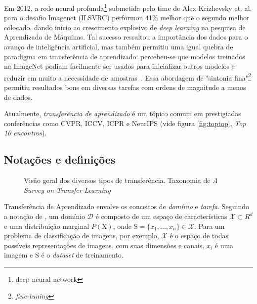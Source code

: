 \documentclass[sigconf]{acmart}
\begin{document}
  Em 2012, a rede neural profunda\footnote{deep neural network} submetida pelo time de Alex Krizhevsky et. al. para o desafio Imagenet (ILSVRC) performou 41\% melhor que o segundo melhor colocado, dando início ao crescimento explosivo de \emph{deep learning} na pesquisa de Aprendizado de Máquinas. Tal sucesso ressaltou a importância dos dados para o avanço de inteligência artificial, mas também permitiu uma igual quebra de paradigma em transferência de aprendizado: percebeu-se que modelos treinados na ImageNet podiam facilmente ser usados para inicializar outros modelos e reduzir em muito a necessidade de amostras~\cite{Ruder2019Neural}.   Essa abordagem de "sintonia fina"\footnote{\emph{fine-tuning}} permitiu resultados bons em diversas tarefas com ordens de magnitude a menos de dados. 

  Atualmente, \emph{transferência de aprendizado} é um tópico comum em prestigiadas conferências como CVPR, ICCV, ICPR e NeurIPS (vide figura \ref{fig:toptop}, \emph{Top 10 encontros}).
  \subsection{Notações e definições}
  \begin{figure}[h]
    \caption{Visão geral dos diversos tipos de transferência. Taxonomia de \emph{A Survey on Transfer Learning} }
    \label{fig:taxonomia}
  \end{figure}
    Transferência de Aprendizado envolve os conceitos de \emph{domínio} e \emph{tarefa}. Seguindo a notação de \cite{PanYang}, um domínio $\mathcal{D}$ é composto de um espaço de características $\mathcal{X}\subset R^d$ e uma distribuição marginal $P(\mathrm{X})$, onde $\mathrm{S}=\{x_1, \dots, x_n\}\in\mathcal{X} $. Para um problema de classificação de imagens, por exemplo, $\mathcal{X}$ é o espaço de todas possíveis representações de imagens, com suas dimensões e canais, $x_i$ é uma imagem e $\mathrm{S}$ é o \textit{dataset} de treinamento. 
\end{document}
